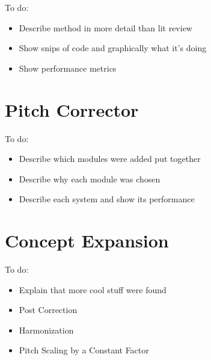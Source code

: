 \color{red}
To do:
\begin{itemize}
	\item Describe method in more detail than lit review
	\item Show snips of code and graphically what it's doing
	\item Show performance metrics
\end{itemize}
\color{black}

\section{Pitch Corrector}

\color{red}
To do:
\begin{itemize}
	\item Describe which modules were added put together
	\item Describe why each module was chosen
	\item Describe each system and show its performance
\end{itemize}
\color{black}

\section{Concept Expansion}

\color{red}
To do:
\begin{itemize}
	\item Explain that more cool stuff were found
	\item Post Correction
	\item Harmonization
	\item Pitch Scaling by a Constant Factor
\end{itemize}
\color{black}
